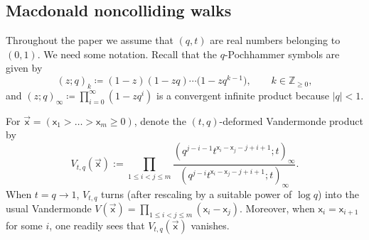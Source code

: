 \subsection{Macdonald noncolliding walks}\label{sub:intro_details}

Throughout the paper we assume that
$(q,t)$ are real numbers belonging to $(0,1)$.
We need some notation.
Recall that the $q$-Pochhammer symbols are given by
\begin{equation*}
	(z;q)_k\coloneqq (1-z)(1-zq)\cdots\big(1-zq^{k-1}\big),
	\qquad
	k\in \mathbb{Z}_{\ge0},
\end{equation*}
and $(z;q)_\infty\coloneqq\prod_{i=0}^{\infty}(1-zq^i)$ is a convergent infinite
product because $|q|<1$.

For $\vec{\mathsf{x}}=(\mathsf{x}_1>\dots>\mathsf{x}_m\ge0 )$,
denote the $(t,q)$-deformed Vandermonde product by
\begin{equation}
	\label{eq:V_tq}
	V_{t,q}(\vec{\mathsf{x}}):=
	\prod_{1\le i<j\le m}
	\frac{\left( q^{j-i-1}t^{\mathsf{x}_i-\mathsf{x}_j-j+i+1};t \right)_{\infty}}
	{(q^{j-i} t^{\mathsf{x}_i-\mathsf{x}_j-j+i+1};t)_{\infty}}.
\end{equation}
When $t=q\to 1$, $V_{t,q}$ turns (after rescaling by a suitable power of $\log q$)
into the
usual Vandermonde
$V(\vec{\mathsf{x}})=\prod_{1\le i<j \le m}(\mathsf{x}_i-
\mathsf{x}_j)$. Moreover,
when $\mathsf{x}_i=\mathsf{x}_{i+1}$ for some $i$,
one readily sees that $V_{t,q}(\vec{\mathsf{x}})$
vanishes.

